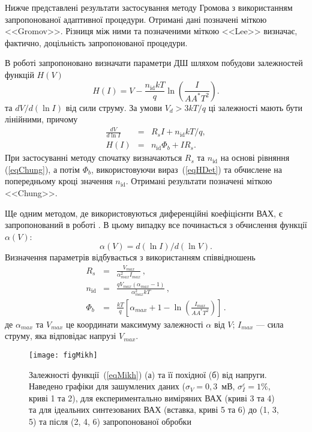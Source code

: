 Нижче представлені результати застосування методу Громова з використанням запропонованої адаптивної процедури.
Отримані дані позначені міткою <<Gromov>>.
Різниця між ними та позначеними міткою <<Lee>> визначає, фактично, доцільність запропонованої процедури.

В роботі \cite{Cheung} запропоновано визначати параметри ДШ шляхом побудови залежностей функцій $H(V)$
\begin{equation}
\label{eqH}
H(I)=V-\frac{n_\mathrm{id}kT}{q}\ln\left(\frac{I}{AA^*T^2}\right).
\end{equation}
та $dV/d(\ln I)$ від сили струму.
За умови $V_d>3kT/q$ ці залежності мають бути лінійними, причому
\begin{eqnarray}
\label{eqChung}
\frac{dV}{d\ln I}&=&R_sI+n_\mathrm{id}kT/q,
\\
\label{eqHDet}
H(I)&=&n_\mathrm{id}\Phi_b+IR_s.
\end{eqnarray}
При застосуванні методу спочатку визначаються $R_s$ та  $n_\mathrm{id}$ на основі рівняння (\ref{eqChung}),
а потім  $\Phi_b$, використовуючи вираз~(\ref{eqHDet}) та обчислене на попередньому кроці значення $n_\mathrm{id}$.
Отримані результати позначені міткою <<Chung>>.

Ще одним методом, де використовуються диференційні коефіцієнти ВАХ, є запропонований в роботі \cite{Mikhelashvili}.
В цьому випадку все починається з обчислення функції  $\alpha(V)$:
\begin{equation}
\label{eqMikh}
\alpha(V)=d(\ln I)/d(\ln V).
\end{equation}
Визначення параметрів відбувається з використанням співвідношень
\begin{eqnarray}
\label{eqMikhDet}
R_s&=&\frac{V_{max}}{\alpha^2_{max}I_{max}}\,,
\\
n_\mathrm{id}&=&\frac{qV_{max}(\alpha_{max}-1)}{\alpha_{max}^2kT}\,,
\\
\Phi_b&=&\frac{kT}{q}\left[\alpha_{max}+1-\ln\left(\frac{I_{max}}{AA^*T^2}\right)\right]\,.\label{eqMikhDetFi}
\end{eqnarray}
де
$\alpha_{max}$ та $V_{max}$  це координати максимуму залежності $\alpha$ від $V$;
$I_{max}$ --- сила струму, яка відповідає напрузі $V_{max}$.

\begin{figure}
\center
\texttt{[image: figMikh]}%
\caption{\label{figMikh}
Залежності функції~(\ref{eqMikh}) (а) та її похідної (б) від напруги.
Наведено графіки для зашумлених даних ($\sigma_V=0,3$~мВ, $\sigma_I^\varepsilon=1\%$, криві 1 та 2), для експериментально виміряних ВАХ (криві 3 та 4) та для ідеальних синтезованих ВАХ (вставка, криві 5 та 6) до (1, 3, 5) та після (2, 4, 6) запропонованої обробки
}
\end{figure}

